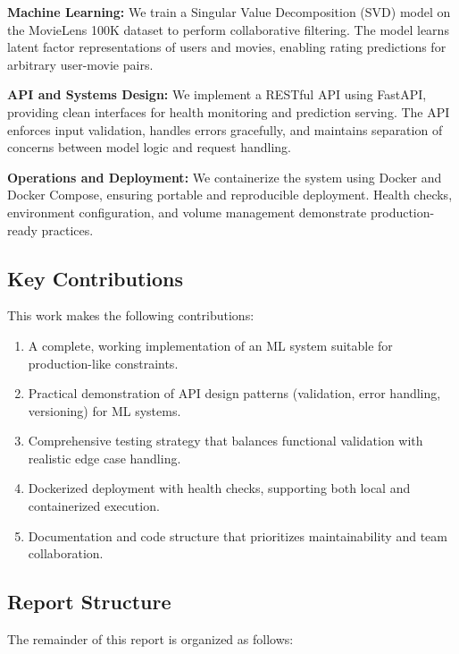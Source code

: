 \textbf{Machine Learning:} We train a Singular Value Decomposition (SVD) model on the MovieLens 100K dataset 
to perform collaborative filtering. The model learns latent factor representations of users and movies, 
enabling rating predictions for arbitrary user-movie pairs.

\textbf{API and Systems Design:} We implement a RESTful API using FastAPI, providing clean interfaces 
for health monitoring and prediction serving. The API enforces input validation, handles errors gracefully, 
and maintains separation of concerns between model logic and request handling.

\textbf{Operations and Deployment:} We containerize the system using Docker and Docker Compose, ensuring 
portable and reproducible deployment. Health checks, environment configuration, and volume management 
demonstrate production-ready practices.

\subsection{Key Contributions}

This work makes the following contributions:

\begin{enumerate}
  \item A complete, working implementation of an ML system suitable for production-like constraints.
  
  \item Practical demonstration of API design patterns (validation, error handling, versioning) for ML systems.
  
  \item Comprehensive testing strategy that balances functional validation with realistic edge case handling.
  
  \item Dockerized deployment with health checks, supporting both local and containerized execution.
  
  \item Documentation and code structure that prioritizes maintainability and team collaboration.
\end{enumerate}

\subsection{Report Structure}

The remainder of this report is organized as follows:

